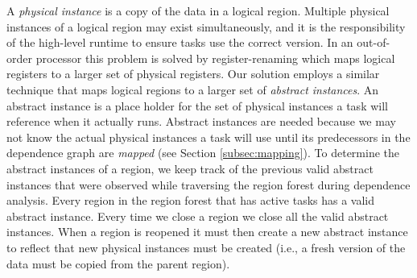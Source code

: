 A {\em physical instance} is a copy of the data in a logical region.  Multiple
physical instances of a logical region may exist simultaneously, and it is the responsibility of the high-level runtime
to ensure tasks use the correct version.
In an out-of-order processor this problem is solved by register-renaming which maps logical
registers to a larger set of physical registers.  Our solution employs a similar technique
that maps logical regions to a larger set of {\em abstract instances}.  An abstract instance
is a place holder for the set of physical instances a task will reference when it actually runs.  
Abstract instances are needed because we may not know the actual physical instances a task will
use until its predecessors in the dependence graph are {\em mapped} 
(see Section \ref{subsec:mapping}).  
To determine the abstract instances of a region, we keep track of 
the previous valid abstract instances that were observed while traversing the region forest
during dependence analysis.  Every region in the region forest that has active tasks
has a valid abstract instance.  Every time we close a region we close all the valid
abstract instances.  When a region is reopened it must then create a new abstract instance
to reflect that new physical instances must be created (i.e., a fresh version of the data must be copied from
the parent region).  







